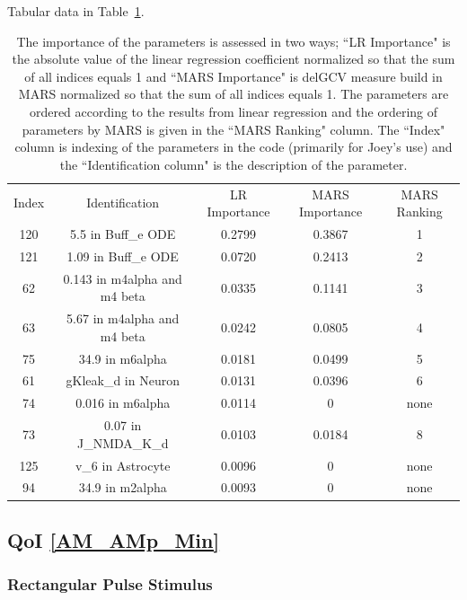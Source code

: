 \documentclass[12pt]{article}
\numberwithin{equation}{section}
\begin{document}
Tabular data in Table~\ref{qoi_K_AC_Mean_ex}.

\begin{table}[h]
\centering
\begin{tabular}{ccccc}
Index & Identification & LR Importance & MARS Importance & MARS Ranking \\
120 & 5.5 in Buff\_e ODE &  0.2799 & 0.3867 & 1\\
121 & 1.09 in Buff\_e ODE & 0.0720 & 0.2413 & 2\\
62 & 0.143 in m4alpha and m4 beta & 0.0335 & 0.1141 & 3\\
63 &   5.67 in m4alpha and m4 beta &  0.0242 & 0.0805 & 4\\
75 & 34.9 in m6alpha & 0.0181 & 0.0499 & 5\\
61 & gKleak\_d in Neuron & 0.0131 & 0.0396 & 6\\
74 & 0.016 in m6alpha & 0.0114 & 0 & none\\
73 & 0.07 in J\_NMDA\_K\_d & 0.0103 & 0.0184 & 8\\
125 & v\_6 in Astrocyte & 0.0096 & 0 & none\\
94 & 34.9 in m2alpha  & 0.0093 & 0 & none\\
\end{tabular}
\caption{The importance of the parameters is assessed in two ways; ``LR Importance" is the absolute value of the linear regression coefficient normalized so that the sum of all indices equals 1 and ``MARS Importance" is delGCV measure build in MARS normalized so that the sum of all indices equals 1. The parameters are ordered according to the results from linear regression and the ordering of parameters by MARS is given in the ``MARS Ranking" column. The ``Index" column is indexing of the parameters in the code (primarily for Joey's use) and the ``Identification column" is the description of the parameter.}
\label{qoi_K_AC_Mean_ex}
\end{table}

\newpage
\subsection{QoI \eqref{AM_AMp_Min}}

\subsubsection{Rectangular Pulse Stimulus}
\end{document}
